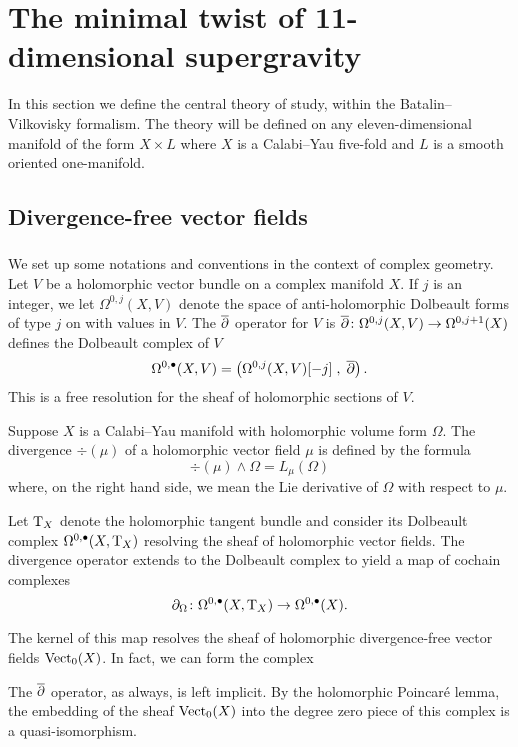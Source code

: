 \section{The minimal twist of 11-dimensional supergravity} 
\label{s:dfn}

In this section we define the central theory of study, within the Batalin--Vilkovisky formalism.
The theory will be defined on any eleven-dimensional manifold of the form $X \times L$ where $X$ is a Calabi--Yau five-fold and $L$ is a smooth oriented one-manifold.

\subsection{Divergence-free vector fields} 

\subsubsection{}
\label{sec:divfree}
We set up some notations and conventions in the context of complex geometry. 
Let $V$ be a holomorphic vector bundle on a complex manifold $X$. 
If $j$ is an integer, we let $\Omega^{0,j}(X, V)$ denote the space of anti-holomorphic Dolbeault forms of type $j$ on with values in $V$.
The $\overline{\partial}$ operator for $V$ is $\overline{\partial} \colon \Omega^{0,j}(X, V)\to \Omega^{0,j+1}(X)$ defines the Dolbeault complex of $V$
\[
  \Omega^{0,\bullet}(X, V) = \left(\Omega^{0,j}(X, V)[-j] \; , \; \overline{\partial}\right) .
\]
This is a free resolution for the sheaf of holomorphic sections of $V$.

Suppose $X$ is a Calabi--Yau manifold with holomorphic volume form $\Omega$.
The divergence $\div(\mu)$ of a holomorphic vector field $\mu$ is defined by the formula
\[
\div (\mu) \wedge \Omega = L_\mu (\Omega)
\]
where, on the right hand side, we mean the Lie derivative of $\Omega$ with respect to $\mu$.

Let ${\rm T}_X$ denote the holomorphic tangent bundle and consider its Dolbeault complex $\Omega^{0,\bullet}(X , {\rm T}_X)$ resolving the sheaf of holomorphic vector fields. 
The divergence operator extends to the Dolbeault complex to yield a map of cochain complexes 
\[
\partial_{\Omega} \colon \Omega^{0,\bullet}(X , {\rm T}_X) \to \Omega^{0,\bullet}(X) .
\]

The kernel of this map resolves the sheaf of holomorphic divergence-free vector fields ${\rm Vect}_0 (X)$.
In fact, we can form the complex 
\beqn\label{eqn:cplx1}
\eeqn
The $\overline{\partial}$ operator, as always, is left implicit. 
By the holomorphic Poincar\'e lemma, the embedding of the sheaf ${\rm Vect}_0(X)$ into the degree zero piece of this complex is a quasi-isomorphism. 

